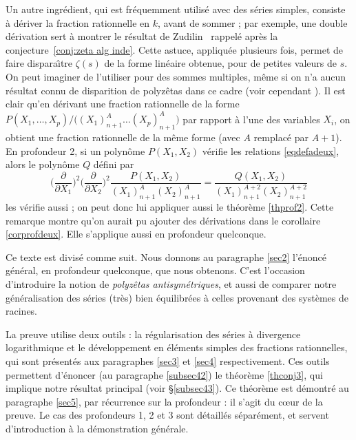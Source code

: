 \documentclass[12pt,francais, reqno]{smfart}
\numberwithin{equation}{section}
\begin{document}
Un autre ingr\'edient, qui est fr\'equemment utilis\'e avec des s\'eries simples, consiste \`a 
d\'eriver la fraction rationnelle en $k$, avant de sommer ; par exemple, une double d\'erivation sert \`a montrer le r\'esultat de 
Zudilin~\cite{Zudilinonze} rappel\'e apr\`es la conjecture~\ref{conj:zeta alg inde}. 
Cette astuce, appliqu\'ee plusieurs fois, permet de faire dispara\^{\i}tre $\zeta(s)$ de la forme lin\'eaire
obtenue, pour de petites valeurs de $s$. On peut imaginer de l'utiliser pour des sommes multiples, m\^eme 
si on n'a aucun r\'esultat connu de disparition de polyz\^etas dans ce cadre (voir cependant \cite{SFHoffman}). Il est clair qu'en d\'erivant 
une fraction rationnelle de la forme 
$P(X_1, \ldots, X_p)/\big((X_1)_{n+1}^{A} \ldots (X_p)_{n+1}^{A}\big)$ par rapport \`a l'une des variables 
$X_i$, on obtient une fraction rationnelle de la m\^eme forme (avec $A$ remplac\'e par $A+1$). En 
profondeur 2, si un polyn\^ome $P(X_1, X_2)$ v\'erifie les relations \eqref{eqdefadeux}, alors 
le polyn\^ome $Q$ d\'efini par 
$$
\Big( \frac{\partial}{\partial X_1} \Big)^2  \Big(\frac{\partial}{\partial X_2} \Big)^2 
\frac{P(X_1, X_2)}{(X_1)_{n+1}^{A}  (X_2)_{n+1}^{A} }
 =   \frac{Q(X_1, X_2)}{(X_1)_{n+1}^{A+2}  (X_2)_{n+1}^{A+2} }
$$
 les v\'erifie aussi ; on peut donc lui appliquer aussi le th\'eor\`eme \ref{thprof2}. Cette 
remarque montre qu'on aurait pu ajouter des d\'erivations dans le corollaire \ref{corprofdeux}. 
Elle s'applique aussi en profondeur quelconque.
 
 \bigskip

Ce texte est divis\'e comme suit. 
Nous donnons au paragraphe \ref{sec2} l'\'enonc\'e g\'en\'eral, en profondeur quelconque, 
que nous obtenons. C'est l'occasion d'introduire la notion de {\em polyz\^etas antisym\'etriques}, et aussi de comparer notre g\'en\'eralisation des s\'eries (tr\`es) bien \'equilibr\'ees \`a celles provenant des syst\`emes de racines.

La preuve utilise deux outils : la r\'egularisation des s\'eries 
\`a divergence logarithmique et le d\'eveloppement en \'el\'ements simples des fractions 
rationnelles, qui sont pr\'esent\'es aux paragraphes \ref{sec3} et \ref{sec4} respectivement. 
Ces outils permettent d'\'enoncer (au paragraphe \ref{subsec42}) le th\'eor\`eme \ref{thconj3},
 qui implique notre r\'esultat principal (voir \S \ref{subsec43}). Ce th\'eor\`eme est 
d\'emontr\'e au paragraphe \ref{sec5}, par r\'ecurrence sur la profondeur : il s'agit 
du c{\oe}ur de la preuve. Le cas des profondeurs 1, 2 et 3 sont d\'etaill\'es s\'epar\'ement, et 
servent d'introduction \`a la d\'emonstration g\'en\'erale.
\end{document}
